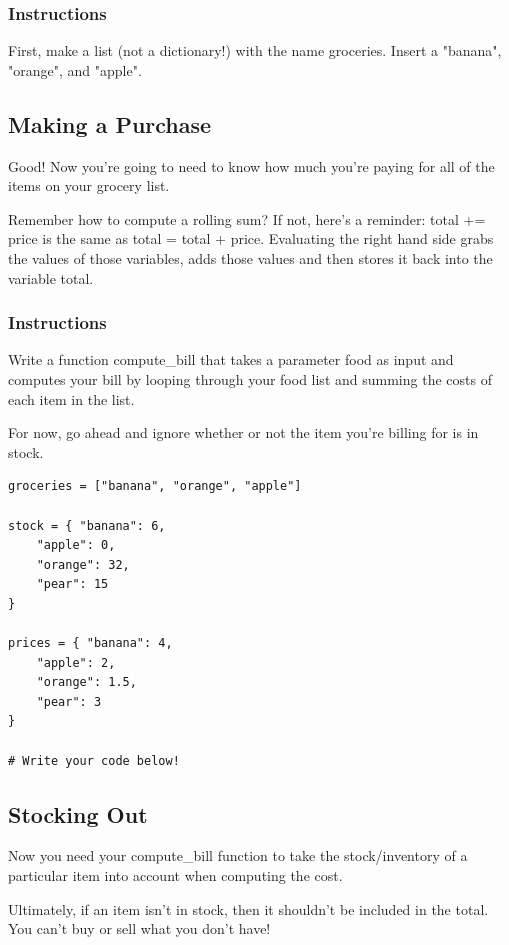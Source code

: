 \documentclass[12pt,a4paper,final,twoside,onecolumn,titlepage]{book}
\begin{document}
\subsubsection{Instructions}

First, make a list (not a dictionary!) with the name groceries. Insert a "banana", "orange", and "apple".

\subsection{Making a Purchase}

Good! Now you're going to need to know how much you’re paying for all of the items on your grocery list.

Remember how to compute a rolling sum? If not, here's a reminder: total += price is the same as total = total + price. Evaluating the right hand side grabs the values of those variables, adds those values and then stores it back into the variable total.
\subsubsection{Instructions}

Write a function compute\_bill that takes a parameter food as input and computes your bill by looping through your food list and summing the costs of each item in the list.

For now, go ahead and ignore whether or not the item you're billing for is in stock.

\begin{lstlisting}
groceries = ["banana", "orange", "apple"]

stock = { "banana": 6,
    "apple": 0,
    "orange": 32,
    "pear": 15
}
    
prices = { "banana": 4,
    "apple": 2,
    "orange": 1.5,
    "pear": 3
}

# Write your code below!
\end{lstlisting}

\subsection{Stocking Out}

Now you need your compute\_bill function to take the stock/inventory of a particular item into account when computing the cost.

Ultimately, if an item isn't in stock, then it shouldn't be included in the total. You can't buy or sell what you don't have!
\end{document}
